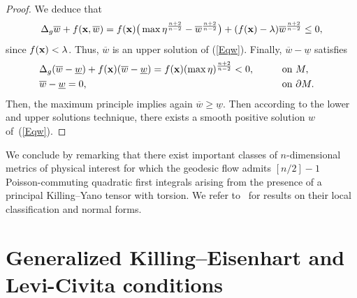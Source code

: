 \documentclass[pdftex]{sigma}
\numberwithin{equation}{section}
\begin{document}
\begin{proof}
We deduce that
\[
\Delta_g \overline{w} + f({\bf x}, \overline{w}) =
f({\bf x})\big(\max \eta^{\frac{n+2}{n-2}} - \overline{w}^{\frac{n+2}{n-2}}\big) +(f({\bf x})-\lambda) \overline{w}^{\frac{n+2}{n-2}} \leq 0,
\]
since $f({\bf x})< \lambda$. Thus, $\overline{w}$ is an upper solution of (\ref{Eqw}). Finally, $\overline{w} - \underline{w}$ satisfies
\begin{alignat*}{3} %
&\Delta_g (\overline{w} - \underline{w}) +f({\bf x}) (\overline{w} - \underline{w}) = f({\bf x}) (\max \eta)^{\frac{n+2}{n-2}} < 0 , \qquad && \textrm{on} \ M,& \\
& \overline{w} - \underline{w} = 0, && \textrm{on} \ \partial M. &
\end{alignat*}
Then, the maximum principle implies again $\overline{w} \geq \underline{w}$. Then according to the lower and upper solutions technique, there exists a smooth positive solution $w$ of~(\ref{Eqw}).
\end{proof}

We conclude by remarking that there exist important classes of $n$-dimensional metrics of physical interest for which the geodesic flow admits $[n/2]-1$ Poisson-commuting quadratic first integrals arising from the presence of a principal Killing--Yano tensor with torsion. We refer to~\cite{Frolov2017, Houri2012} for results on their local classification and normal forms.

\section{Generalized Killing--Eisenhart and Levi-Civita conditions}
\end{document}
